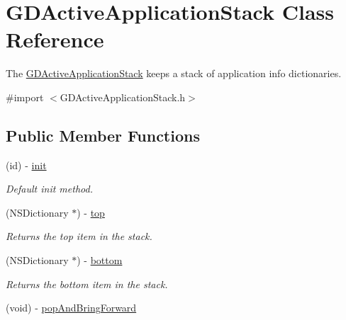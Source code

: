 \hypertarget{interface_g_d_active_application_stack}{
\section{GDActiveApplicationStack Class Reference}
\label{interface_g_d_active_application_stack}
}


The \hyperlink{interface_g_d_active_application_stack}{GDActiveApplicationStack} keeps a stack of application info dictionaries.  


{\ttfamily \#import $<$GDActiveApplicationStack.h$>$}\subsection*{Public Member Functions}
\begin{DoxyCompactItemize}
\item 
(id) -\/ \hyperlink{interface_g_d_active_application_stack_a691da7b73f204f9431b96ffa53783bc6}{init}
\begin{DoxyCompactList}\small\item\em Default init method. \item\end{DoxyCompactList}\item 
\hypertarget{interface_g_d_active_application_stack_a51fa9794d729046db9561631d4e2dc33}{
(NSDictionary $\ast$) -\/ \hyperlink{interface_g_d_active_application_stack_a51fa9794d729046db9561631d4e2dc33}{top}}
\label{interface_g_d_active_application_stack_a51fa9794d729046db9561631d4e2dc33}

\begin{DoxyCompactList}\small\item\em Returns the top item in the stack. \item\end{DoxyCompactList}\item 
\hypertarget{interface_g_d_active_application_stack_a5c475dbd5059fe0bb8a70c7fe4f6c396}{
(NSDictionary $\ast$) -\/ \hyperlink{interface_g_d_active_application_stack_a5c475dbd5059fe0bb8a70c7fe4f6c396}{bottom}}
\label{interface_g_d_active_application_stack_a5c475dbd5059fe0bb8a70c7fe4f6c396}

\begin{DoxyCompactList}\small\item\em Returns the bottom item in the stack. \item\end{DoxyCompactList}\item 
\hypertarget{interface_g_d_active_application_stack_a3a2dbff7e4b5278d599e4e3ed8abb60b}{
(void) -\/ \hyperlink{interface_g_d_active_application_stack_a3a2dbff7e4b5278d599e4e3ed8abb60b}{popAndBringForward}}
\label{interface_g_d_active_application_stack_a3a2dbff7e4b5278d599e4e3ed8abb60b}


\end{DoxyCompactItemize}
